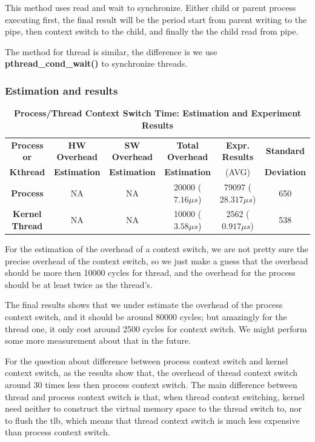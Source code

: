 This method uses read and wait to synchronize. Either child or parent process executing first, the final result will be the period start from parent writing to the pipe, then context switch to the child, and finally the the child read from pipe.

The method for thread is similar, the difference is we use \textbf{pthread\_cond\_wait()} to synchronize threads.


\subsubsection{Estimation and results}
\begin{table}[ht]
    \centering
    \caption{\textbf{Process/Thread Context Switch Time: Estimation and Experiment Results}}
    \hspace*{-2em}\begin{threeparttable}
        \begin{tabular}{cccccc}
        \hline
        \textbf{Process or} & \textbf{HW Overhead} & \textbf{SW Overhead } & \textbf{Total Overhead} & \textbf{Expr.        Results} & \textbf{Standard} \\
        \textbf{Kthread} & \textbf{Estimation}       &  \textbf{Estimation}         & \textbf{Estimation}  & (AVG)   & \textbf{Deviation}\\
        \hline
        \textbf{Process} & NA & NA & 20000 ($7.16 \mu s$) & 79097 ($28.317 \mu s$)  &  650\\
        \textbf{Kernel Thread} & NA & NA & 10000 ($3.58 \mu s$) & 2562 ($0.917 \mu s$) & 538\\
        \hline
        \end{tabular}
    \end{threeparttable}
    \label{context_switch_time}
\end{table}

For the estimation of the overhead of a context switch, we are not pretty sure the precise overhead of the context switch, so we just make a guess that the overhead should be more then 10000 cycles for thread, and the overhead for the process should be at least twice as the thread's.

The final results shows that we under estimate the overhead of the process context switch, and it should be around 80000 cycles; but amazingly for the thread one, it only cost around 2500 cycles for context switch. We might perform some more measurement about that in the future.

For the question about difference between process context switch and kernel context switch, as the results show that, the overhead of thread context switch around 30 times less then process context switch. The main difference between thread and process context switch
is that, when thread context switching, kernel need neither to construct the virtual memory space to the thread switch to, nor to flush the tlb, which means that thread context switch is much less expensive than process context switch.

